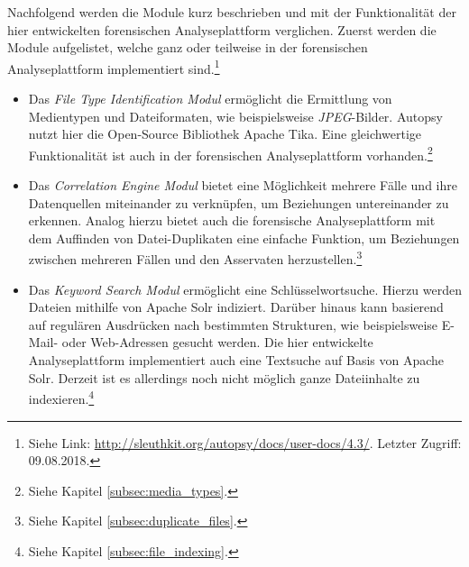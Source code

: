 \noindent
Nachfolgend werden die Module kurz beschrieben und mit der Funktionalität der hier entwickelten forensischen Analyseplattform verglichen. Zuerst werden die Module aufgelistet, welche ganz oder teilweise in der forensischen Analyseplattform implementiert sind.\footnote{Siehe Link: \url{http://sleuthkit.org/autopsy/docs/user-docs/4.3/}. Letzter Zugriff: 09.08.2018.}

\begin{itemize}
\item Das \textit{File Type Identification Modul} ermöglicht die Ermittlung von Medientypen und Dateiformaten, wie beispielsweise \textit{JPEG}-Bilder. Autopsy nutzt hier die Open-Source Bibliothek Apache Tika\texttrademark. Eine gleichwertige Funktionalität ist auch in der forensischen Analyseplattform vorhanden.\footnote{Siehe Kapitel \ref{subsec:media_types}.}
\item Das \textit{Correlation Engine Modul} bietet eine Möglichkeit mehrere Fälle und ihre Datenquellen miteinander zu verknüpfen, um Beziehungen untereinander zu erkennen. Analog hierzu bietet auch die forensische Analyseplattform mit dem Auffinden von Datei-Duplikaten eine einfache Funktion, um Beziehungen zwischen mehreren Fällen und den Asservaten herzustellen.\footnote{Siehe Kapitel \ref{subsec:duplicate_files}.}
\item Das \textit{Keyword Search Modul} ermöglicht eine Schlüsselwortsuche. Hierzu werden Dateien mithilfe von Apache Solr indiziert. Darüber hinaus kann basierend auf regulären Ausdrücken nach bestimmten Strukturen, wie beispielsweise E-Mail- oder Web-Adressen gesucht werden. Die hier entwickelte Analyseplattform implementiert auch eine Textsuche auf Basis von Apache Solr. Derzeit ist es allerdings noch nicht möglich ganze Dateiinhalte zu indexieren.\footnote{Siehe Kapitel \ref{subsec:file_indexing}.}
\end{itemize}

